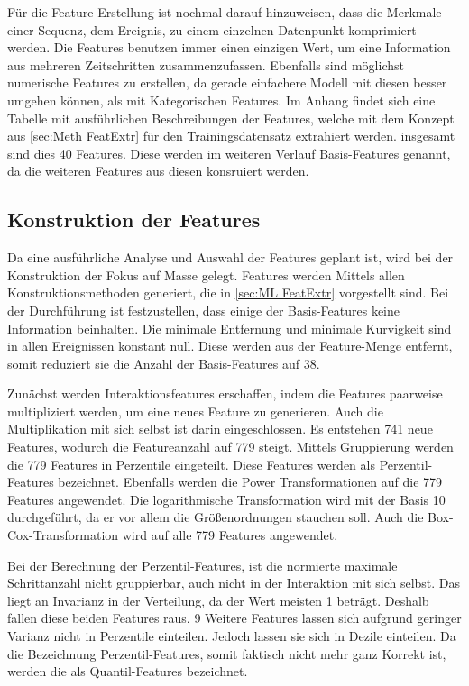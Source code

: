 Für die Feature-Erstellung ist nochmal darauf hinzuweisen, dass die Merkmale einer Sequenz, dem Ereignis, zu einem einzelnen Datenpunkt komprimiert werden. Die Features benutzen immer einen einzigen Wert, um eine Information aus mehreren Zeitschritten zusammenzufassen. Ebenfalls sind möglichst numerische Features zu erstellen, da gerade einfachere Modell mit diesen besser umgehen können, als mit Kategorischen Features. Im Anhang findet sich eine Tabelle mit ausführlichen Beschreibungen der Features, welche mit dem Konzept aus \autoref{sec:Meth FeatExtr} für den Trainingsdatensatz extrahiert werden. insgesamt sind dies 40 Features. Diese werden im weiteren Verlauf Basis-Features genannt, da die weiteren Features aus diesen konsruiert werden.\par


\subsection{Konstruktion der Features} \label{sec:Meth KonstrFeatures}
Da eine ausführliche Analyse und Auswahl der Features geplant ist, wird bei der Konstruktion der Fokus auf Masse gelegt. Features werden Mittels allen Konstruktionsmethoden generiert, die in \autoref{sec:ML FeatExtr} vorgestellt sind. Bei der Durchführung ist festzustellen, dass einige der Basis-Features keine Information beinhalten. Die minimale Entfernung und minimale Kurvigkeit sind in allen Ereignissen konstant null. Diese werden aus der Feature-Menge entfernt, somit reduziert sie die Anzahl der Basis-Features auf 38.\par

Zunächst werden Interaktionsfeatures erschaffen, indem die Features paarweise multipliziert werden, um eine neues Feature zu generieren. Auch die Multiplikation mit sich selbst ist darin eingeschlossen. Es entstehen 741 neue Features, wodurch die Featureanzahl auf 779 steigt. Mittels Gruppierung werden die 779 Features in Perzentile eingeteilt. Diese Features werden als Perzentil-Features bezeichnet. Ebenfalls werden die Power Transformationen auf die 779 Features angewendet. Die logarithmische Transformation wird mit der Basis 10 durchgeführt, da er vor allem die Größenordnungen stauchen soll. Auch die Box-Cox-Transformation wird auf alle 779 Features angewendet. \par

Bei der Berechnung der Perzentil-Features, ist die normierte maximale Schrittanzahl nicht gruppierbar, auch nicht in der Interaktion mit sich selbst. Das liegt an Invarianz in der Verteilung, da der Wert meisten 1 beträgt. Deshalb fallen diese beiden Features raus. 9 Weitere Features lassen sich aufgrund geringer Varianz nicht in Perzentile einteilen. Jedoch lassen sie sich in Dezile einteilen. Da die Bezeichnung Perzentil-Features, somit faktisch nicht mehr ganz Korrekt ist, werden die als Quantil-Features bezeichnet. \par

